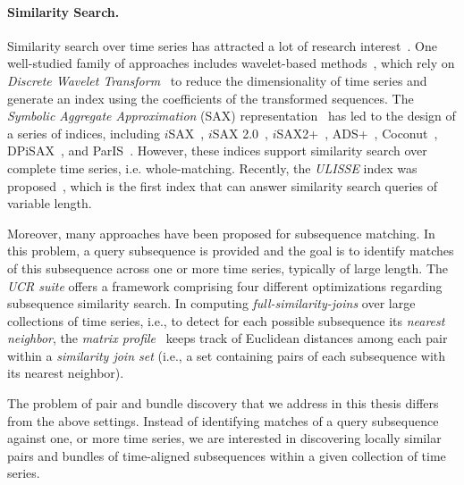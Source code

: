 \paragraph{Similarity Search.} Similarity search over time series has attracted a lot of research interest~\cite{DBLP:journals/pvldb/EchihabiZPB18}. One well-studied family of approaches includes wavelet-based methods~\cite{chan1999icde}, which rely on \emph{Discrete Wavelet Transform}~\cite{graps1995cse} to reduce the dimensionality of time series and generate an index using the coefficients of the transformed sequences. The \emph{Symbolic Aggregate Approximation} (SAX) representation~\cite{jessica2007dmkd} has led to the design of a series of indices, including $i$SAX~\cite{shieh2008kdd}, $i$SAX 2.0~\cite{camerra2010icdm}, $i$SAX2+~\cite{camerra2014kais}, ADS+~\cite{zoumpatianos2014sigmod}, Coconut~\cite{DBLP:journals/pvldb/KondylakisDZP18}, DPiSAX~\cite{dpisaxjournal}, and ParIS~\cite{DBLP:conf/bigdataconf/PengFP18}. However, these indices support similarity search over complete time series, i.e. whole-matching. Recently, the \textit{ULISSE} index was proposed~\cite{linardi2018scalable}, which is the first index that can answer similarity search queries of variable length. 

Moreover, many approaches have been proposed for subsequence matching. In this problem, a query subsequence is provided and the goal is to identify matches of this subsequence across one or more time series, typically of large length. The \textit{UCR suite} \cite{rakthanmanon2012searching} offers a framework comprising four different optimizations regarding subsequence similarity search. In computing \textit{full-similarity-joins} over large collections of time series, i.e., to detect for each possible subsequence its \textit{nearest neighbor}, the \textit{matrix profile}~\cite{yeh2016matrix} keeps track of Euclidean distances among each pair within a \textit{similarity join set} (i.e., a set containing pairs of each subsequence with its nearest neighbor).

The problem of pair and bundle discovery that we address in this thesis differs from the above settings. Instead of identifying matches of a query subsequence against one, or more time series, we are interested in discovering locally similar pairs and bundles of time-aligned subsequences within a given collection of time series.

